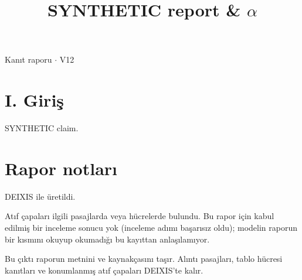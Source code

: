 \documentclass[journal]{IEEEtran}
\begin{document}
\renewcommand{\abstractname}{Özet}
\renewcommand{\IEEEkeywordsname}{Dizin Terimleri}
\renewcommand{\refname}{Kaynaklar}

\title{SYNTHETIC report \& \ensuremath{\alpha}}

\maketitle

\noindent Kanıt raporu \ensuremath{\cdot} V12

\section*{I. Giriş}

SYNTHETIC claim. \cite{Synth26}

\section*{Rapor notları}

DEIXIS ile üretildi.

Atıf çapaları ilgili pasajlarda veya hücrelerde bulundu. Bu rapor için kabul edilmiş bir inceleme sonucu yok (inceleme adımı başarısız oldu); modelin raporun bir kısmını okuyup okumadığı bu kayıttan anlaşılamıyor.

Bu çıktı raporun metnini ve kaynakçasını taşır. Alıntı pasajları, tablo hücresi kanıtları ve konumlanmış atıf çapaları DEIXIS'te kalır.




\end{document}
